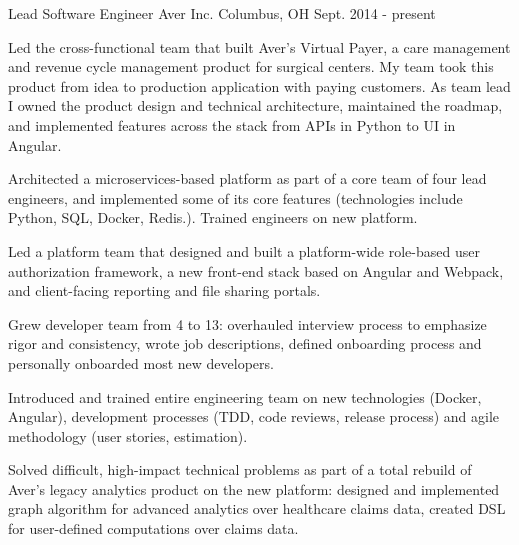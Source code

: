 

\begin{cventries}

  \cventry
    {Lead Software Engineer} %
    {Aver Inc.} %
    {Columbus, OH} %
    {Sept. 2014 - present} %
    {
      \begin{cvitems} %
        \item {Led the cross-functional team that built Aver's Virtual Payer, a care management and revenue cycle management product for surgical centers.
        My team took this product from idea to production application with paying customers.
        As team lead I owned the product design and technical architecture, maintained the roadmap, and implemented features across the stack from APIs in Python to UI in Angular.}
        \item {Architected a microservices-based platform as part of a core team of four lead engineers, and implemented some of its core features (technologies include Python, SQL, Docker, Redis.).
        Trained engineers on new platform.}
        \item {Led a platform team that designed and built a platform-wide role-based user authorization framework, a new front-end stack based on Angular and Webpack, and client-facing reporting and file sharing portals.}
        \item {Grew developer team from 4 to 13: overhauled interview process to emphasize rigor and consistency, wrote job descriptions, defined onboarding process and personally onboarded most new developers.}
        \item {Introduced and trained entire engineering team on new technologies (Docker, Angular), development processes (TDD, code reviews, release process) and agile methodology (user stories, estimation).}
        \item {Solved difficult, high-impact technical problems as part of a total rebuild of Aver's legacy analytics product on the new platform: designed and implemented graph algorithm for advanced analytics over healthcare claims data, created DSL for user-defined computations over claims data.}
      \end{cvitems}
    }


\end{cventries}
